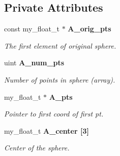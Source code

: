 \subsection*{Private Attributes}
\begin{CompactItemize}
\item 
const my\_\-float\_\-t $\ast$ \bf{A\_\-orig\_\-pts}\label{classASCbase_1_1DiscreteSphere_84eda7819366feacab69b8eca58b90a5}

\begin{CompactList}\small\item\em The first element of original sphere. \item\end{CompactList}\item 
uint \bf{A\_\-num\_\-pts}\label{classASCbase_1_1DiscreteSphere_75720a63fc626c586eab6e8e8342f00b}

\begin{CompactList}\small\item\em Number of points in sphere (array). \item\end{CompactList}\item 
my\_\-float\_\-t $\ast$ \bf{A\_\-pts}\label{classASCbase_1_1DiscreteSphere_6fa35750d9d3be1543df6e5fe88efa66}

\begin{CompactList}\small\item\em Pointer to first coord of first pt. \item\end{CompactList}\item 
my\_\-float\_\-t \bf{A\_\-center} [3]\label{classASCbase_1_1DiscreteSphere_c38903731c1e07ab1b6a72aba830abfb}

\begin{CompactList}\small\item\em Center of the sphere. \item\end{CompactList}\end{CompactItemize}
